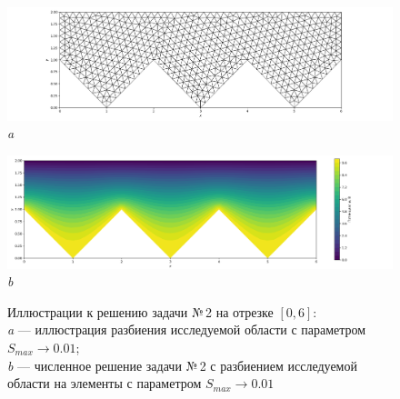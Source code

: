 \documentclass[12pt, a4paper]{article}
\begin{document}
			\begin{figure}[h]       
				\begin{center} 
					{ 
						\begin{minipage}{0.9\textwidth} 
							\centering 
							\hspace*{-17mm}
							\includegraphics[width=1.2\columnwidth]{Test_domain_4_mesh001_3_in_row_calfem_net_1.png}\\ 
							\textit{a} 
						\end{minipage}                                 
					} 
					{ 
						\begin{minipage}{1\textwidth} 
							\centering 
							\hspace*{-8.5mm}
							\includegraphics[width=1.2\columnwidth]{Test_domain_4_mesh001_3_in_row_calfem.png}\\ 
							\textit{b} 
						\end{minipage}                                 
					} 
								
				\end{center} 
				\vspace*{-2.0mm} 
				\caption{Иллюстрации к решению задачи №\,2 на отрезке $\left[ 0, 6 \right]$:\\
					\textit{a} --- иллюстрация разбиения исследуемой области с параметром $S_{max} \rightarrow 0.01$; \\
					\textit{b} --- численное решение задачи №\,2 с разбиением исследуемой области на  элементы с параметром $S_{max} \rightarrow 0.01$ \\
				} 
			\end{figure}
			\vspace*{-10mm}
\end{document}
